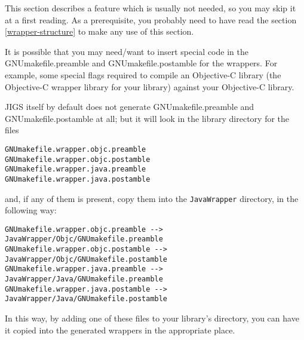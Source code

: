 This section describes a feature which is usually not needed, so you
may skip it at a first reading.  As a prerequisite, you probably need
to have read the section \ref{wrapper-structure} to make any use of
this section.

It is possible that you may need/want to insert special code in the
GNUmakefile.preamble and GNUmakefile.postamble for the wrappers.  For
example, some special flags required to compile an Objective-C library
(the Objective-C wrapper library for your library) against your
Objective-C library.

JIGS itself by default does not generate GNUmakefile.preamble and
GNUmakefile.postamble at all; but it will look in the library
directory for the files 
\begin{verbatim}
GNUmakefile.wrapper.objc.preamble
GNUmakefile.wrapper.objc.postamble
GNUmakefile.wrapper.java.preamble
GNUmakefile.wrapper.java.postamble
\end{verbatim}
and, if any of them is present, copy them into the \texttt{JavaWrapper} 
directory, in the following way:
\begin{verbatim}
GNUmakefile.wrapper.objc.preamble --> JavaWrapper/Objc/GNUmakefile.preamble
GNUmakefile.wrapper.objc.postamble --> JavaWrapper/Objc/GNUmakefile.postamble
GNUmakefile.wrapper.java.preamble --> JavaWrapper/Java/GNUmakefile.preamble
GNUmakefile.wrapper.java.postamble --> JavaWrapper/Java/GNUmakefile.postamble
\end{verbatim}

In this way, by adding one of these files to your library's directory,
you can have it copied into the generated wrappers in the appropriate
place.
